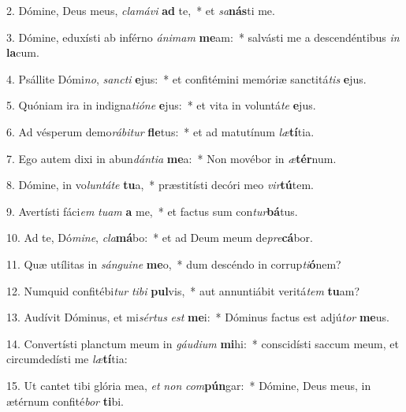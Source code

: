 2. Dómine, Deus meus, \textit{cla}\textit{má}\textit{vi} \textbf{ad} te,~*  et \textit{sa}\textbf{nás}ti me.\

3. Dómine, eduxísti ab inférno \textit{á}\textit{ni}\textit{mam} \textbf{me}am:~*  salvásti me a descendéntibus \textit{in} \textbf{la}cum.\

4. Psállite Dómi\textit{no}, \textit{sanc}\textit{ti} \textbf{e}jus:~*  et confitémini memóriæ sanctitá\textit{tis} \textbf{e}jus.\

5. Quóniam ira in indigna\textit{ti}\textit{ó}\textit{ne} \textbf{e}jus:~*  et vita in voluntá\textit{te} \textbf{e}jus.\

6. Ad vésperum demo\textit{rá}\textit{bi}\textit{tur} \textbf{fle}tus:~*  et ad matutínum \textit{læ}\textbf{tí}tia.\

7. Ego autem dixi in abun\textit{dán}\textit{ti}\textit{a} \textbf{me}a:~*  Non movébor in \textit{æ}\textbf{tér}num.\

8. Dómine, in vo\textit{lun}\textit{tá}\textit{te} \textbf{tu}a,~*  præstitísti decóri meo \textit{vir}\textbf{tú}tem.\

9. Avertísti fáci\textit{em} \textit{tu}\textit{am} \textbf{a} me,~*  et factus sum con\textit{tur}\textbf{bá}tus.\

10. Ad te, Dó\textit{mi}\textit{ne}, \textit{cla}\textbf{má}bo:~*  et ad Deum meum de\textit{pre}\textbf{cá}bor.\

11. Quæ utílitas in \textit{sán}\textit{gui}\textit{ne} \textbf{me}o,~*  dum descéndo in corrup\textit{ti}\textbf{ó}nem?\

12. Numquid confitébi\textit{tur} \textit{ti}\textit{bi} \textbf{pul}vis,~*  aut annuntiábit veritá\textit{tem} \textbf{tu}am?\

13. Audívit Dóminus, et mi\textit{sér}\textit{tus} \textit{est} \textbf{me}i:~*  Dóminus factus est adjú\textit{tor} \textbf{me}us.\

14. Convertísti planctum meum in \textit{gáu}\textit{di}\textit{um} \textbf{mi}hi:~*  conscidísti saccum meum, et circumdedísti me \textit{læ}\textbf{tí}tia:\

15. Ut cantet tibi glória mea, \textit{et} \textit{non} \textit{com}\textbf{pún}gar:~*  Dómine, Deus meus, in ætérnum confité\textit{bor} \textbf{ti}bi.\

